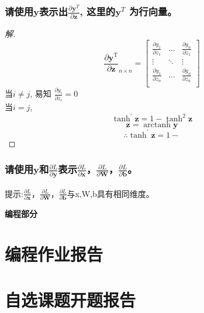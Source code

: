 \documentclass[a4paper]{article}
\DeclareMathOperator{\arctanh}{arctanh}
\begin{document}
\subsubsection{请使用$\mathbf{y}$表示出$\frac{\partial \mathbf{y}^T}{\partial \mathbf{z}}$, 这里的$\mathbf{y}^T$ 为行向量。}
\begin{proof}[解]
    
    \[\frac{\partial \boldsymbol{y}^\mathrm{T}}{\partial \boldsymbol{z}}_{n \times n} = 
    \begin{bmatrix}
        \frac{\partial y_1}{\partial z_1} & \dots & \frac{\partial y_n}{\partial z_1} \\
        \vdots & \ddots & \vdots \\
        \frac{\partial y_1}{\partial z_n} & \dots & \frac{\partial y_n}{\partial z_n} \\
    \end{bmatrix}\]
    当$i \neq j$, 易知 $\frac{\partial y_i}{\partial z_i} = 0$ \\
    当$i = j$, 
    \[\tanh^\prime \boldsymbol{z} = 1 - \tanh ^2 \boldsymbol{z}\]
    \[\boldsymbol z = \arctanh \boldsymbol y\]
    \[\therefore \tanh^\prime \boldsymbol z = 1 - \]
\end{proof}

\subsubsection{请使用$\mathbf{y}$和$\frac{\partial L}{\partial \mathbf{y}}$表示$\frac{\partial L}{\partial \mathbf{x}}$，$\frac{\partial L}{\partial \mathbf{W}}$，$\frac{\partial L}{\partial \mathbf{b}}$。}
提示:$\frac{\partial L}{\partial \mathbf{x}}$，$\frac{\partial L}{\partial \mathbf{W}}$，$\frac{\partial L}{\partial \mathbf{b}}$与x,W,b具有相同维度。
\vspace{6mm}
\centerline{\textbf{\Large{编程部分}}}


\vspace{3mm}
\section{编程作业报告}

\section{自选课题开题报告}
\end{document}
